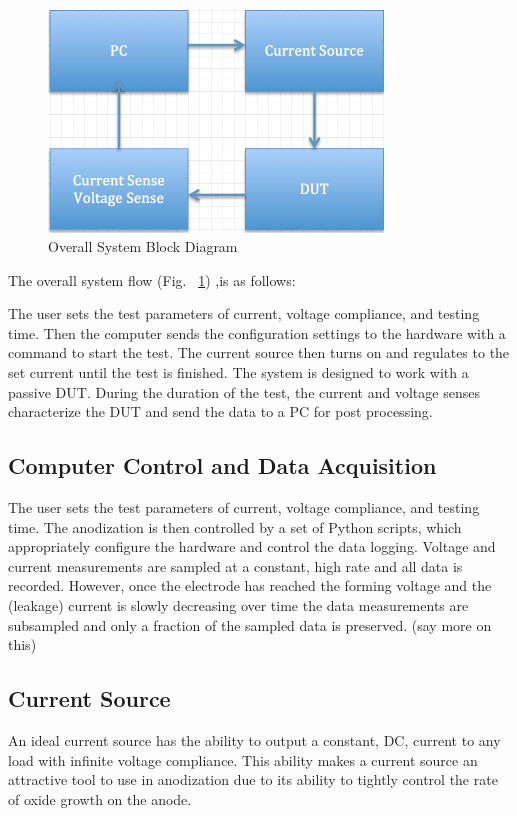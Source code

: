 \documentclass[journal]{IEEEtran}
\begin{document}
\begin{figure}[here]
\centering
\includegraphics[width=3.5in]{blockDiagram}
\caption{Overall System Block Diagram}
\label{fig:blockDiagram}
\end{figure}

The overall system flow (Fig. ~\ref{fig:blockDiagram}) ,is as follows:

The user sets the test parameters of current, voltage compliance, and testing time. Then the computer sends the configuration settings to the hardware with a command to start the test. The current source then turns on and regulates to the set current until the test is finished. The system is designed to work with a passive DUT. During the duration of the test, the current and voltage senses characterize the DUT and send the data to a PC for post processing.

\subsection{Computer Control and Data Acquisition}

The user sets the test parameters of current, voltage compliance, and testing time. The anodization is then controlled by a set of Python scripts, which appropriately configure the hardware and control the data logging. Voltage and current measurements are sampled at a constant, high rate and all data is recorded. However, once the electrode has reached the forming voltage and the (leakage) current is slowly decreasing over time the data measurements are subsampled and only a fraction of the sampled data is preserved.  (say more on this)

    \subsection{Current Source}

    An ideal current source has the ability to output a constant, DC, current to any load with infinite voltage compliance. This ability makes a current source an attractive tool to use in anodization due to its ability to tightly control the rate of oxide growth on the anode.
\end{document}
